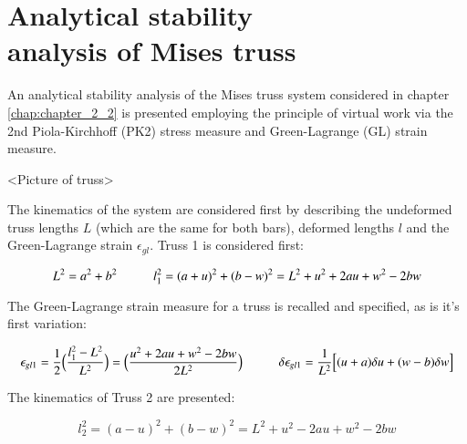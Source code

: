 
\chapter[Analytical stability analysis of Mises truss]{Analytical stability\\ analysis of Mises truss}
\label{app:Analytical stability analysis of Mises truss}

An analytical stability analysis of the Mises truss system considered in chapter \ref{chap:chapter_2_2} is presented employing the principle of virtual work via the 2nd Piola-Kirchhoff (PK2) stress measure and Green-Lagrange (GL) strain measure.

<Picture of truss>

The kinematics of the system are considered first by describing the undeformed truss lengths $L$ (which are the same for both bars), deformed lengths $l$ and the Green-Lagrange strain $\epsilon_{gl}$. Truss 1 is considered first:

\begin{equation} 
L^2 = a^2 + b^2
\hspace{10mm}
l_1^2 = (a+u)^2 + (b-w)^2 = L^2 + u^2 + 2au +w^2 -2bw
\label{eqapp0_1}
\end{equation}

The Green-Lagrange strain measure for a truss is recalled and specified, as is it's first variation:

\begin{equation} 
\epsilon_{gl1} = \frac{1}{2}
\Big(\frac{l_1^2-L^2}{L^2}\Big)
=
\Big(\frac{u^2 + 2au +w^2 -2bw}{2L^2}\Big)
\hspace{10mm}
\delta\epsilon_{gl1} = 
\frac{1}{L^2}
\Big[
(u+a)\delta u
+
(w-b)\delta w
\Big]
\label{eqapp0_2}
\end{equation}

The kinematics of Truss 2 are presented:

\begin{equation} 
l_2^2 = (a-u)^2 + (b-w)^2 = L^2 + u^2 - 2au +w^2 -2bw
\label{eqapp0_2_1}
\end{equation}

